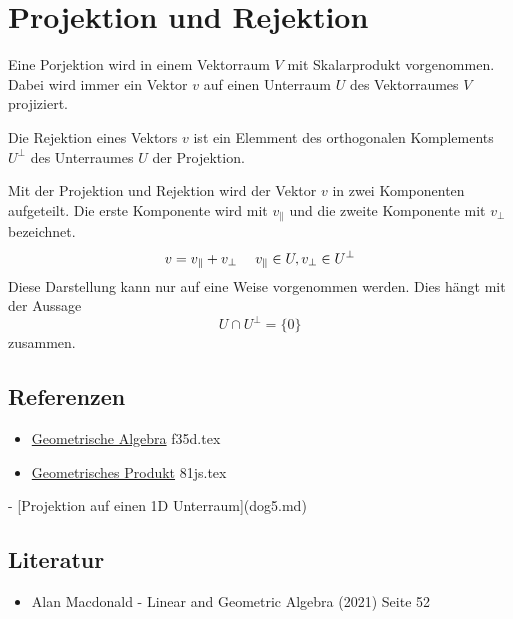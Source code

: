 \documentclass{sajzk}
\begin{document}
\section{Projektion und Rejektion}
\label{fmjb}

Eine Porjektion wird in einem Vektorraum $V$ mit Skalarprodukt vorgenommen.
Dabei wird immer ein Vektor $v$ auf einen Unterraum $U$ des Vektorraumes $V$
projiziert.

Die Rejektion eines Vektors $v$ ist ein Elemment des orthogonalen Komplements
$U^\perp$ des Unterraumes $U$ der Projektion.

Mit der Projektion und Rejektion wird der Vektor $v$ in zwei Komponenten
aufgeteilt. Die erste Komponente wird mit $v_\parallel$ und die zweite
Komponente mit $v_\perp$ bezeichnet.
$$v = v_\parallel + v_\perp\hspace{3ex} v_\parallel \in U, v_\perp \in U^\perp$$
Diese Darstellung kann nur auf eine Weise vorgenommen werden. Dies hängt mit
der Aussage 
$$U\cap U^\perp = \{0\}$$
zusammen.

\subsection{Referenzen}
\begin{itemize}
    \item \href{f35d.pdf}{Geometrische Algebra} f35d.tex
    \item \href{81js.pdf}{Geometrisches Produkt} 81js.tex
\end{itemize}
- [Projektion auf einen 1D Unterraum](dog5.md)

\subsection{Literatur}
\begin{itemize}
    \item Alan Macdonald - Linear and Geometric Algebra (2021) Seite 52
\end{itemize}
\end{document}
